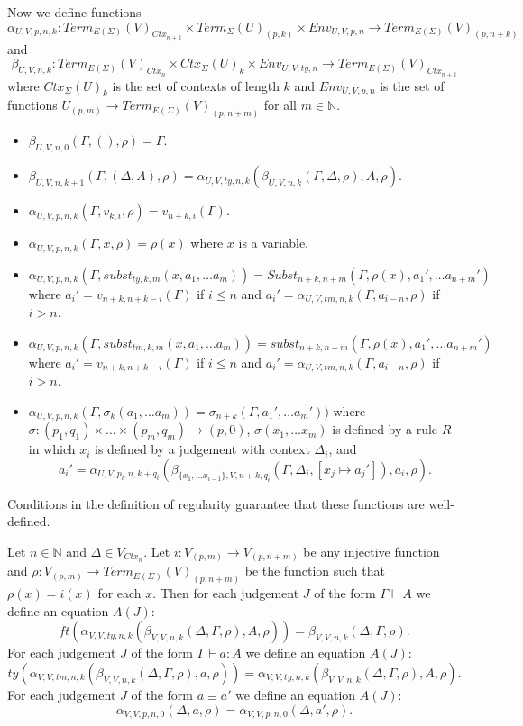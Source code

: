 \documentclass[reqno]{amsart}
\theoremstyle{definition}
\theoremstyle{remark}
\newcommand{\deq}{\equiv}
\numberwithin{figure}{section}
\begin{document}
Now we define functions
\[ \alpha_{U,V,p,n,k} : Term_{E(\Sigma)}(V)_{Ctx_{n+k}} \times Term_{\Sigma}(U)_{(p,k)} \times Env_{U,V,p,n} \to Term_{E(\Sigma)}(V)_{(p,n+k)} \]
and
\[ \beta_{U,V,n,k} : Term_{E(\Sigma)}(V)_{Ctx_n} \times Ctx_\Sigma(U)_k \times Env_{U,V,ty,n} \to Term_{E(\Sigma)}(V)_{Ctx_{n+k}} \]
where $Ctx_\Sigma(U)_k$ is the set of contexts of length $k$ and $Env_{U,V,p,n}$ is the set of functions $U_{(p,m)} \to Term_{E(\Sigma)}(V)_{(p,n+m)}$ for all $m \in \mathbb{N}$.
\begin{itemize}
\item $\beta_{U,V,n,0}(\Gamma, (), \rho) = \Gamma$.
\item $\beta_{U,V,n,k+1}(\Gamma, (\Delta,A), \rho) = \alpha_{U,V,ty,n,k}(\beta_{U,V,n,k}(\Gamma, \Delta, \rho), A, \rho)$.
\item $\alpha_{U,V,p,n,k}(\Gamma, v_{k,i}, \rho) = v_{n+k,i}(\Gamma)$.
\item $\alpha_{U,V,p,n,k}(\Gamma, x, \rho) = \rho(x)$ where $x$ is a variable.
\item $\alpha_{U,V,p,n,k}(\Gamma, subst_{ty,k,m}(x, a_1, \ldots a_m)) = Subst_{n+k,n+m}(\Gamma, \rho(x), a_1', \ldots a_{n+m}')$
    where $a_i' = v_{n+k,n+k-i}(\Gamma)$ if $i \leq n$ and $a_i' = \alpha_{U,V,tm,n,k}(\Gamma, a_{i-n}, \rho)$ if $i > n$.
\item $\alpha_{U,V,p,n,k}(\Gamma, subst_{tm,k,m}(x, a_1, \ldots a_m)) = subst_{n+k,n+m}(\Gamma, \rho(x), a_1', \ldots a_{n+m}')$
    where $a_i' = v_{n+k,n+k-i}(\Gamma)$ if $i \leq n$ and $a_i' = \alpha_{U,V,tm,n,k}(\Gamma, a_{i-n}, \rho)$ if $i > n$.
\item $\alpha_{U,V,p,n,k}(\Gamma, \sigma_k(a_1, \ldots a_m)) = \sigma_{n+k}(\Gamma, a_1', \ldots a_m'))$
    where $\sigma : (p_1,q_1) \times \ldots \times (p_m,q_m) \to (p,0)$,
    $\sigma(x_1, \ldots x_m)$ is defined by a rule $R$ in which $x_i$ is defined by a judgement with context $\Delta_i$, and
    \[ a_i' = \alpha_{U,V,p_i,n,k+q_i}(\beta_{\{ x_1, \ldots x_{i-1} \},V,n+k,q_i}(\Gamma, \Delta_i, [x_j \mapsto a_j']), a_i, \rho). \]
\end{itemize}
Conditions in the definition of regularity guarantee that these functions are well-defined.

Let $n \in \mathbb{N}$ and $\Delta \in V_{Ctx_n}$.
Let $i : V_{(p,m)} \to V_{(p,n+m)}$ be any injective function and $\rho : V_{(p,m)} \to Term_{E(\Sigma)}(V)_{(p,n+m)}$ be the function such that $\rho(x) = i(x)$ for each $x$.
Then for each judgement $J$ of the form $\Gamma \vdash A$ we define an equation $A(J)$:
\[ ft(\alpha_{V,V,ty,n,k}(\beta_{V,V,n,k}(\Delta, \Gamma, \rho), A, \rho)) = \beta_{V,V,n,k}(\Delta, \Gamma, \rho). \]
For each judgement $J$ of the form $\Gamma \vdash a : A$ we define an equation $A(J)$:
\[ ty(\alpha_{V,V,tm,n,k}(\beta_{V,V,n,k}(\Delta, \Gamma, \rho), a, \rho)) = \alpha_{V,V,ty,n,k}(\beta_{V,V,n,k}(\Delta, \Gamma, \rho), A, \rho). \]
For each judgement $J$ of the form $a \deq a'$ we define an equation $A(J)$:
\[ \alpha_{V,V,p,n,0}(\Delta, a, \rho) = \alpha_{V,V,p,n,0}(\Delta, a', \rho). \]
\end{document}
